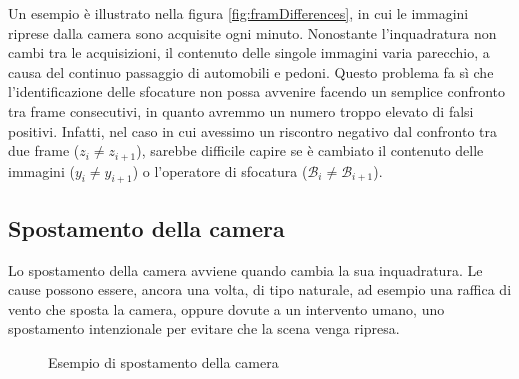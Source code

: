 \noindent Un esempio \`e illustrato nella figura \ref{fig:framDifferences}, in cui le immagini riprese dalla camera sono acquisite ogni minuto. 
Nonostante l'inquadratura non cambi tra le acquisizioni, il contenuto delle singole immagini varia parecchio, a causa del continuo passaggio di automobili e pedoni.
Questo problema fa s\`i che l'identificazione delle sfocature non possa avvenire facendo un semplice confronto tra frame consecutivi, in quanto avremmo un numero troppo elevato di falsi positivi.
Infatti, nel caso in cui avessimo un riscontro negativo dal confronto tra due frame ($z_i \neq z_{i + 1}$), sarebbe difficile capire se \`e cambiato il contenuto delle immagini ($y_i \neq y_{i + 1}$) o l'operatore di sfocatura ($\mathcal{B}_i \neq \mathcal{B}_{i + 1}$). 
\subsection{Spostamento della camera}
\label{displacement}
Lo spostamento della camera avviene quando cambia la sua inquadratura.
Le cause possono essere, ancora una volta, di tipo naturale, ad esempio una raffica di vento che sposta la camera, oppure dovute a un intervento umano, uno spostamento intenzionale per evitare che la scena venga ripresa.
\begin{figure}
	\centering
	\caption{Esempio di spostamento della camera}
	\label{fig:testiDISPLACEMENT}
\end{figure}
